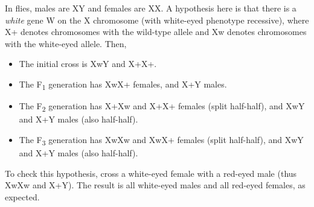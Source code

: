 In flies, males are XY and females are XX. A hypothesis here is that there is a \emph{white} gene W on the X chromosome (with white-eyed phenotype recessive), where X\tss+ denotes chromosomes with the wild-type allele and X\tss w denotes chromosomes with the white-eyed allele. Then, 
\begin{itemize}
	\item The initial cross is X\tss wY and X\tss+X\tss+.
	\item The F\textsubscript1 generation has X\tss wX\tss+ females, and X\tss+Y males.
	\item The F\textsubscript2 generation has X\tss+X\tss w and X\tss+X\tss+ females (split half-half), and X\tss wY and X\tss+Y males (also half-half).
	\item The F\textsubscript3 generation has X\tss wX\tss w and X\tss wX\tss+ females (split half-half), and X\tss wY and X\tss+Y males (also half-half).
\end{itemize}

To check this hypothesis, cross a white-eyed female with a red-eyed male (thus X\tss wX\tss w and X\tss+Y). The result is all white-eyed males and all red-eyed females, as expected.
